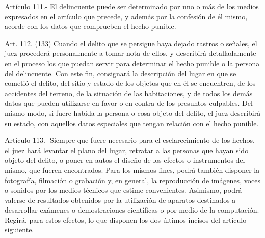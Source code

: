     Artículo 111.- El delincuente puede ser determinado por uno o más de los medios expresados en el artículo que precede, y además por la confesión de él mismo, acorde con los datos que comprueben el hecho punible.

    Art. 112. (133) Cuando el delito que se persigue haya dejado rastros o señales, el juez procederá personalmente a tomar nota de ellos, y describirá detalladamente en el proceso los que puedan servir para determinar el hecho punible o la persona del delincuente.
    Con este fin, consignará la descripción del lugar en que se cometió el delito, del sitio y estado de los objetos que en él se encuentren, de los accidentes del terreno, de la situación de las habitaciones, y de todos los demás datos que pueden utilizarse en favor o en contra de los presuntos culpables.
    Del mismo modo, si fuere habida la persona o cosa objeto del delito, el juez describirá su estado, con aquellos datos especiales que tengan relación con el hecho punible.

    Artículo 113.- Siempre que fuere necesario para el esclarecimiento de los hechos, el juez hará levantar el plano del lugar, retratar a las personas que hayan sido objeto del delito, o poner en autos el diseño de los efectos o instrumentos del mismo, que fueren encontrados.
    Para los mismos fines, podrá también disponer la fotografía, filmación o grabación y, en general, la reproducción de imágenes, voces o sonidos por los medios técnicos que estime convenientes.  Asimismo, podrá valerse de resultados obtenidos por la utilización de aparatos destinados a desarrollar exámenes o demostraciones científicas o por medio de la computación.  Regirá, para estos efectos, lo que disponen los dos últimos incisos del artículo siguiente.


